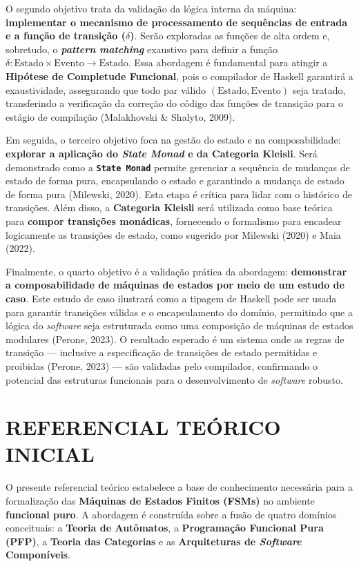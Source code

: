 \documentclass[12pt,a4paper]{article}
\begin{document}
O segundo objetivo trata da validação da lógica interna da máquina: \textbf{implementar o mecanismo de processamento de sequências de entrada e a função de transição ($\delta$)}. Serão exploradas as funções de alta ordem e, sobretudo, o \textbf{\textit{pattern matching}} exaustivo para definir a função $\delta: \text{Estado} \times \text{Evento} \to \text{Estado}$. Essa abordagem é fundamental para atingir a \textbf{Hipótese de Completude Funcional}, pois o compilador de Haskell garantirá a exaustividade, assegurando que todo par válido $(\text{Estado}, \text{Evento})$ seja tratado, transferindo a verificação da correção do código das funções de transição para o estágio de compilação (Malakhovski \& Shalyto, 2009).

Em seguida, o terceiro objetivo foca na gestão do estado e na composabilidade: \textbf{explorar a aplicação do \textit{State Monad} e da Categoria Kleisli}. Será demonstrado como a \textbf{\texttt{State Monad}} permite gerenciar a sequência de mudanças de estado de forma pura, encapsulando o estado e garantindo a mudança de estado de forma pura (Milewski, 2020). Esta etapa é crítica para lidar com o histórico de transições. Além disso, a \textbf{Categoria Kleisli} será utilizada como base teórica para \textbf{compor transições monádicas}, fornecendo o formalismo para encadear logicamente as transições de estado, como sugerido por Milewski (2020) e Maia (2022).

Finalmente, o quarto objetivo é a validação prática da abordagem: \textbf{demonstrar a composabilidade de máquinas de estados por meio de um estudo de caso}. Este estudo de caso ilustrará como a tipagem de Haskell pode ser usada para garantir transições válidas e o encapsulamento do domínio, permitindo que a lógica do \textit{software} seja estruturada como uma composição de máquinas de estados modulares (Perone, 2023). O resultado esperado é um sistema onde as regras de transição --- inclusive a especificação de transições de estado permitidas e proibidas (Perone, 2023) --- são validadas pelo compilador, confirmando o potencial das estruturas funcionais para o desenvolvimento de \textit{software} robusto.

\section{REFERENCIAL TEÓRICO INICIAL}
O presente referencial teórico estabelece a base de conhecimento necessária para a formalização das \textbf{Máquinas de Estados Finitos (FSMs)} no ambiente \textbf{funcional puro}. A abordagem é construída sobre a fusão de quatro domínios conceituais: a \textbf{Teoria de Autômatos}, a \textbf{Programação Funcional Pura (PFP)}, a \textbf{Teoria das Categorias} e as \textbf{Arquiteturas de \textit{Software} Componíveis}.
\end{document}
